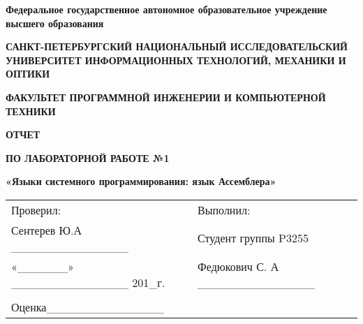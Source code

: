 \documentclass[12pt]{article}
\begin{document}
\pagestyle{empty}
\begin{center}
\normalsize
\textbf{Федеральное государственное автономное образовательное учреждение высшего образования}

\small
\medskip 
\textbf{САНКТ-ПЕТЕРБУРГСКИЙ НАЦИОНАЛЬНЫЙ ИССЛЕДОВАТЕЛЬСКИЙ  УНИВЕРСИТЕТ ИНФОРМАЦИОННЫХ ТЕХНОЛОГИЙ, МЕХАНИКИ И ОПТИКИ}

\medskip 
\textbf{ФАКУЛЬТЕТ ПРОГРАММНОЙ ИНЖЕНЕРИИ И КОМПЬЮТЕРНОЙ ТЕХНИКИ}
\end{center}
\bigskip\bigskip\bigskip\bigskip\bigskip\bigskip\bigskip\bigskip\bigskip\bigskip\bigskip\bigskip
\begin{center}
\par\medskip\par\smallskip
\Large
 
\par\smallskip
\textbf{ОТЧЕТ} 

\textbf{ПО ЛАБОРАТОРНОЙ РАБОТЕ №1}

\large
\par\bigskip
\textbf{«Языки системного программирования: язык Ассемблера»}
\par\bigskip\par\bigskip\par\bigskip\par\bigskip\par\bigskip\par\bigskip
\par\bigskip\par\bigskip\par\bigskip\par\bigskip\par\bigskip\par\bigskip
\par\bigskip\par\bigskip\par\bigskip\par\bigskip\par\bigskip\par\bigskip
\end{center}
\begin{center}
\begin{tabular}{lllll}
Проверил:	 	  							& \hspace{80pt}	&	Выполнил:								&\\
Сентерев Ю.А	 \_\_\_\_\_\_\_\_\_\_\_\_\_\_		&			&	Студент группы P3255					&\\
«\_\_\_\_\_\_» 	\_\_\_\_\_\_\_\_\_\_\_\_\_\_ 201\_г.	& 			&	Федюкович С. А \_\_\_\_\_\_\_\_\_\_\_\_\_\_	&\\
										&			&										&\\
Оценка\hspace{12pt}\_\_\_\_\_\_\_\_\_\_\_\_\_\_	&			&										&\\
\end{tabular}
\par\bigskip\par\bigskip\par\bigskip
                                                  
\par\bigskip \par\bigskip
\end{center}
\end{document}
